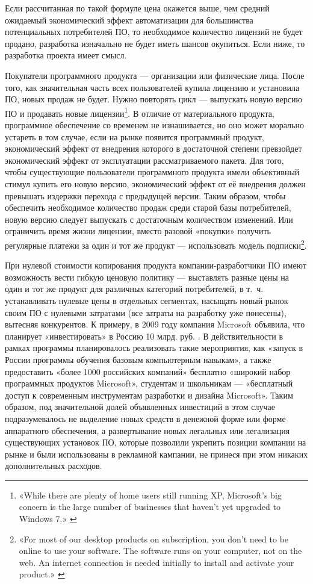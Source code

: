 \documentclass{article}
\begin{document}
Если рассчитанная по такой формуле цена окажется выше, чем средний ожидаемый экономический эффект автоматизации для большинства потенциальных потребителей ПО, то необходимое количество лицензий не будет продано, разработка изначально не будет иметь шансов окупиться. Если ниже, то разработка проекта имеет смысл.

Покупатели программного продукта — организации или физические лица. После того, как значительная часть всех пользователей купила лицензию и установила ПО, новых продаж не будет. Нужно повторять цикл — выпускать новую версию ПО и продавать новые лицензии\footnote{«While there are plenty of home users still running XP, Microsoft’s big concern is the large number of businesses that haven’t yet upgraded to Windows 7.» \cite{windowsXPLegacy}}. В отличие от материального продукта, программное обеспечение со временем не изнашивается, но оно может морально устареть в том случае, если на рынке появится программный продукт, экономический эффект от внедрения которого в достаточной степени превзойдет экономический эффект от эксплуатации рассматриваемого пакета. Для того, чтобы существующие пользователи программного продукта имели объективный стимул купить его новую версию, экономический эффект от её внедрения должен превышать издержки перехода с предыдущей версии. Таким образом, чтобы обеспечить необходимое количество продаж среди старой базы потребителей, новую версию следует выпускать с достаточным количеством изменений. Или ограничить время жизни лицензии, вместо разовой «покупки» получить регулярные платежи за один и тот же продукт — использовать модель подписки\footnote{«For most of our desktop products on subscription, you don't need to be online to use your software. The software runs on your computer, not on the web. An internet connection is needed initially to install and activate your product.» \cite{autodeskSubscription}}.

При нулевой стоимости копирования продукта компании-разработчики ПО имеют возможность вести гибкую ценовую политику — выставлять разные цены на один и тот же продукт для различных категорий потребителей, в т.~ч. устанавливать нулевые цены в отдельных сегментах, насыщать новый рынок своим ПО с нулевыми затратами (все затраты на разработку уже понесены), вытесняя конкурентов. К примеру, в 2009 году компания Microsoft объявила, что планирует «инвестировать» в Россию 10 млрд. руб. \cite{microsoftInvestsRF}. В действительности в рамках программы планировалось реализовать такие мероприятия, как «запуск в России программы обучения базовым компьютерным навыкам», а также предоставить «более 1000 российских компаний» бесплатно «широкий набор программных продуктов Microsoft», студентам и школьникам — «бесплатный доступ к современным инструментам разработки и дизайна Microsoft». Таким образом, под значительной долей объявленных инвестиций в этом случае подразумевалось не выделение новых средств в денежной форме или форме аппаратного обеспечения, а развертывание новых легальных или легализация существующих установок ПО, которые позволили укрепить позиции компании на рынке и были использованы в рекламной кампании, не принеся при этом никаких дополнительных расходов.
\end{document}
